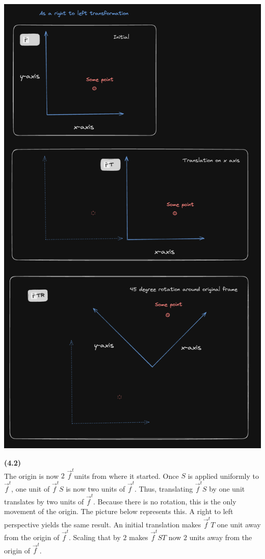 \documentclass[letterpaper, 11pt]{article}
\newcommand{\ft}{$\vec{f}^t$}
\begin{document}
\medskip
\includegraphics[scale=0.6]{./pics/q1_rtl.png}

\newpage 
\noindent \textbf{(4.2)} \\ 
The origin is now $2$ \ft units from where it started. Once $S$ is applied uniformly to \ft, one unit of \ft$S$ is now two units of \ft. Thus, translating \ft$S$ by one unit translates by two units of \ft. Because there is no rotation, this is the only movement of the origin. The picture below represents this. A right to left perspective yields the same result. An initial translation makes \ft$T$ one unit away from the origin of \ft. Scaling that by $2$ makes \ft$ST$ now $2$ units away from the origin of \ft.
\end{document}
